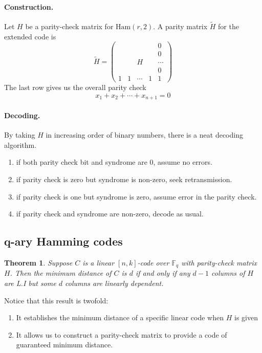 \documentclass[11pt,a4paper]{article}
\theoremstyle{definition}
\theoremstyle{plain}
\newtheorem{theorem}[definition]{Theorem}
\theoremstyle{remark}
\begin{document}
\paragraph{Construction.} Let $H$ be a parity-check matrix for $\text{Ham}(r,2)$. A parity matrix $\tilde{H}$ for the extended 
code is 
$$\tilde{H} = \begin{pmatrix}
    & & & & 0 \\
    & & & & 0 \\
    & & H & & \cdots \\
    & & & & 0 \\
    1 & 1 & \cdots & 1 & 1 
\end{pmatrix}$$
The last row gives us the overall parity check 
$$x_1 + x_2 + \cdots + x_{n+1} = 0$$

\paragraph{Decoding.} By taking $H$ in increasing order of binary numbers, there is a neat 
decoding algorithm. 
\begin{enumerate}[label = (\roman*)]
    \item if both parity check bit and syndrome are $0$, assume no errors. 
    \item if parity check is zero but syndrome is non-zero, seek retransmission. 
    \item if parity check is one but syndrome is zero, assume error in the parity check. 
    \item if parity check and syndrome are non-zero, decode as usual.
\end{enumerate}

\subsection{q-ary Hamming codes}

\begin{theorem}\label{thm:distance-to-parity-check}
    Suppose $C$ is a linear $[n,k]$-code over $\mathbb{F}_q$ with parity-check matrix $H$. Then the minimum distance of $C$ is $d$ 
    if and only if any $d - 1$ columns of $H$ are L.I but some $d$ columns are linearly dependent.
\end{theorem}

Notice that this result is twofold: 
\begin{enumerate}
    \item It establishes the minimum distance of a specific linear code when $H$ is given
    \item It allows us to construct a parity-check matrix to provide a code of guaranteed minimum distance. 
\end{enumerate}
\end{document}
